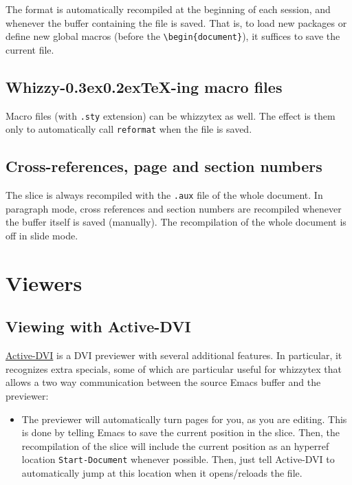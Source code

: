 \documentclass[12pt]{article}
\makeatletter
\let \lst \verb
\def \whizzy {{Whizzy\kern -0.3ex\raise 0.2ex\hbox{\let \@\relax\TeX}}}
\makeatother
\begin{document}
The format is automatically recompiled at the beginning of each session, and
whenever the buffer containing the file is saved. That is, to load new
packages or define new global macros (before the \lst"\begin{document}"), it
suffices to save the current file.

\subsection {\whizzy-ing macro files} 

Macro files (with \lst".sty" extension) can be whizzytex as well.  The
effect is them only to automatically call \lst"reformat" when the file is
saved.


\subsection {Cross-references, page and section numbers} 

The slice is always recompiled with the \lst".aux" file of the whole
document.  In paragraph mode, cross references and section numbers are 
recompiled whenever the buffer itself is saved (manually). 
The recompilation of the whole document is off in slide mode.


\section{Viewers}

\def \ActiveDVI {Active-DVI}

\subsection {Viewing with \ActiveDVI}

\href{http://pauillac.inria.fr/advi/}{\ActiveDVI} is a DVI previewer with
several additional features. 
In particular, it recognizes extra specials, some of which are particular 
useful for whizzytex that allows a two way communication between 
the source Emacs buffer and the previewer: 
\begin {itemize}
\item
The previewer will automatically turn pages for you, as you are editing. 
This is done by telling Emacs to save the current position in the slice. 
Then, the recompilation of the slice will include the current position 
as an hyperref location \lst"Start-Document" whenever possible. 
Then, just tell {\ActiveDVI} to automatically jump at this location
when it opens/reloads the file. 


\end{itemize}
\end{document}
\end{document}

